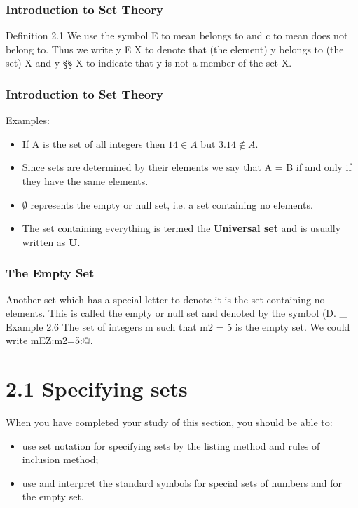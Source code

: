 \documentclass{beamer}
\begin{document}
\begin{frame} %
\frametitle{Introduction to Set Theory}
\Large
Deﬁnition 2.1 
We use the symbol E to mean belongs to and ¢ to mean does not belong to.
Thus we write y E X to denote that (the element) y belongs to (the set) X and y §§ X to indicate
that y is not a member of the set X.
\begin{frame} %
\frametitle{Introduction to Set Theory}
\Large
Examples:

\begin{itemize}
\item If A is the set of all integers then $14 \in A$ but $3.14 \notin A.$
\item Since sets are determined by their elements we say that A = B if and only
if they have the same elements.

\item $\emptyset$ represents the empty or null set, i.e. a set containing no elements.
\item The set containing everything is termed the \textbf{Universal set} and is usually
written as \textbf{U}.
\end{itemize}
\end{frame}
\begin{frame}

\frametitle{The Empty Set}

Another set which has a special letter to denote it is the set containing no elements. This is called
the empty or null set and denoted by the symbol (D. _
Example 2.6 The set of integers m such that m2 = 5 is the empty set. We could write
{mEZ:m2=5}:@.
\end{frame}

\section{2.1 Specifying sets}
\begin{frame}
When you have completed your study of this section, you should be able to:
\begin{itemize}
\item use set notation for specifying sets by the listing method and rules of inclusion method;
\item use and interpret the standard symbols for special sets of numbers and for the empty set.
\end{itemize}


\end{frame}
\end{frame}
\end{document}
